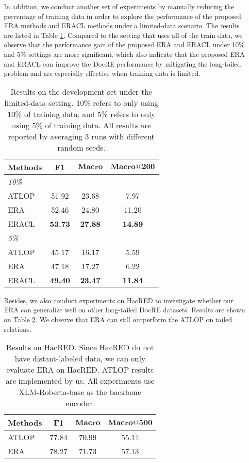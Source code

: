 \documentclass[11pt]{article}
\begin{document}
    In addition, we conduct another set of experiments by manually reducing the percentage of training data in order to explore the performance of the proposed ERA methods and ERACL methods under a limited-data scenario. The results are listed in Table \ref{tb:with-few-data}. Compared to the setting that uses all of the train data, we observe that the performance gain of the proposed ERA and ERACL under 10\% and 5\% settings are more significant, which also indicate that the proposed ERA and ERACL can improve the DocRE performance by mitigating the long-tailed problem and are especially effective when training data is limited.
    \begin{table}[!h]
        \centering
        \begin{tabular}{lccc}
            \toprule
            Methods & F1 & $\mathbf{Macro}$ & $\mathbf{Macro@200}$\\
            \midrule
            \textit{10\%} &  &  &     \\
            ATLOP &51.92   &23.68  &7.97  \\
            ERA    &52.46   &24.80  &11.20   \\
            ERACL    &\bf{53.73}   &\bf{27.88}  &\bf{14.89}   \\
            \hline
            \textit{5\%} &  &  &     \\
            ATLOP    &45.17   &16.17   &5.59    \\
            ERA     &47.18  &17.27    &6.22    \\
            ERACL     &\bf{49.40}   &\bf{23.47}   &\bf{11.84}    \\
            \toprule
        \end{tabular}
        \caption{Results on the development set under the limited-data setting. 10\% refers to only using 10\% of training data, and 5\% refers to only using 5\% of training data. All results are reported by averaging 3 runs with different random seeds.}
        \label{tb:with-few-data}
    \end{table}
    
    Besides, we also conduct experiments on HacRED to investigate whether our ERA can generalize well on other long-tailed DocRE datasets. Results are shown on Table \ref{tb:hacred-results}. We observe that ERA can still outperform the ATLOP on tailed relations.
    
     \begin{table}[!h]
        \centering
        \begin{tabular}{lccc}
            \toprule
            Methods & F1 & $\mathbf{Macro}$ & $\mathbf{Macro@500}$\\
            \midrule
            ATLOP &77.84   &70.99  &55.11  \\
            ERA    &78.27   &71.73  &57.13   \\
            \hline
            \toprule
        \end{tabular}
        \caption{Results on HacRED. Since HacRED do not have distant-labeled data, we can only evaluate ERA on HacRED. ATLOP results are implemented by us. All experiments use XLM-Roberta-base as the backbone encoder.}
        \label{tb:hacred-results}
    \end{table}
    
\end{document}
